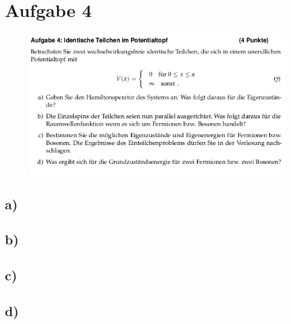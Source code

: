 \section{Aufgabe 4}
\begin{figure}[H]
    \centering
    \includegraphics[width=\textwidth]{images/ex4.jpg}
\end{figure}

\subsection{a)}

\subsection{b)}

\subsection{c)}

\subsection{d)}


